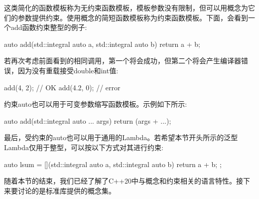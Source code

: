 这类简化的函数模板称为无约束函数模板，模板参数没有限制，但可以用概念为它们的参数提供约束。使用概念的简短函数模板称为约束函数模板。下面，会看到一个add函数约束整型的例子:

\begin{cpp}
auto add(std::integral auto a, std::integral auto b)
{
	return a + b;
}
\end{cpp}

若再次考虑前面看到的相同调用，第一个将会成功，但第二个将会产生编译器错误，因为没有重载接受double和int值:

\begin{cpp}
add(4, 2); // OK
add(4.2, 0); // error
\end{cpp}

约束auto也可以用于可变参数缩写函数模板。示例如下所示:

\begin{cpp}
auto add(std::integral auto ... args)
{
	return (args + ...);
}
\end{cpp}

最后，受约束的auto也可以用于通用的Lambda。若希望本节开头所示的泛型Lambda仅用于整型，可以按以下方式对其进行约束:

\begin{cpp}
auto lsum = [](std::integral auto a, std::integral auto b)
{
	return a + b;
};
\end{cpp}

随着本节的结束，我们已经了解了C++20中与概念和约束相关的语言特性。接下来要讨论的是标准库提供的概念集。






























